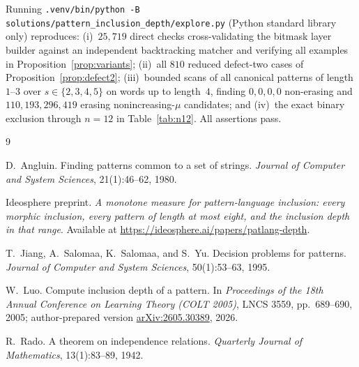 \documentclass[11pt]{article}
\theoremstyle{plain}
\theoremstyle{definition}
\theoremstyle{remark}
\begin{document}
Running \texttt{.venv/bin/python -B solutions/pattern\_inclusion\_depth/explore.py} (Python standard library only) reproduces: (i)~$25{,}719$ direct checks cross-validating the bitmask layer builder against an independent backtracking matcher and verifying all examples in Proposition~\ref{prop:variants}; (ii)~all $810$ reduced defect-two cases of Proposition~\ref{prop:defect2}; (iii)~bounded scans of all canonical patterns of length $1$--$3$ over $s \in \{2,3,4,5\}$ on words up to length~$4$, finding $0,0,0,0$ non-erasing and $110,193,296,419$ erasing nonincreasing-$\mu$ candidates; and (iv)~the exact binary exclusion through $n = 12$ in Table~\ref{tab:n12}. All assertions pass.

\begin{thebibliography}{9}

D.~Angluin.
Finding patterns common to a set of strings.
\emph{Journal of Computer and System Sciences}, 21(1):46--62, 1980.

Ideosphere preprint.
\emph{A monotone measure for pattern-language inclusion: every morphic inclusion, every pattern of length at most eight, and the inclusion depth in that range}.
Available at \url{https://ideosphere.ai/papers/patlang-depth}.

T.~Jiang, A.~Salomaa, K.~Salomaa, and S.~Yu.
Decision problems for patterns.
\emph{Journal of Computer and System Sciences}, 50(1):53--63, 1995.

W.~Luo.
Compute inclusion depth of a pattern.
In \emph{Proceedings of the 18th Annual Conference on Learning Theory (COLT 2005)}, LNCS 3559, pp.~689--690, 2005; author-prepared version \href{https://arxiv.org/abs/2605.30389}{arXiv:2605.30389}, 2026.

R.~Rado.
A theorem on independence relations.
\emph{Quarterly Journal of Mathematics}, 13(1):83--89, 1942.

\end{thebibliography}
\end{document}
